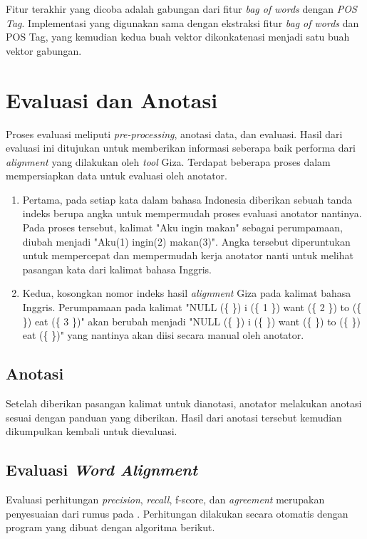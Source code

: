 Fitur terakhir yang dicoba adalah gabungan dari fitur \textit{bag of words} dengan \textit{POS Tag}. Implementasi yang digunakan sama dengan ekstraksi fitur \textit{bag of words} dan POS Tag, yang kemudian kedua buah vektor dikonkatenasi menjadi satu buah vektor gabungan.

\section{Evaluasi dan Anotasi}

Proses evaluasi meliputi \textit{pre-processing}, anotasi data, dan evaluasi. Hasil dari evaluasi ini ditujukan untuk memberikan informasi seberapa baik performa dari \textit{alignment} yang dilakukan oleh \textit{tool} Giza. Terdapat beberapa proses dalam mempersiapkan data untuk evaluasi oleh anotator.
\begin{enumerate}
	\item Pertama, pada setiap kata dalam bahasa Indonesia diberikan sebuah tanda indeks berupa angka untuk mempermudah proses evaluasi anotator nantinya. Pada proses tersebut, kalimat "Aku ingin makan" sebagai perumpamaan, diubah menjadi "Aku(1) ingin(2) makan(3)". Angka tersebut diperuntukan untuk mempercepat dan mempermudah kerja anotator nanti untuk melihat pasangan kata dari kalimat bahasa Inggris.
	\item Kedua, kosongkan nomor indeks hasil \textit{alignment} Giza pada kalimat bahasa Inggris. Perumpamaan pada kalimat "NULL (\{  \}) i (\{ 1 \}) want (\{ 2 \}) to (\{  \}) eat (\{ 3 \})" akan berubah menjadi  "NULL (\{  \}) i (\{  \}) want (\{   \}) to (\{  \}) eat (\{  \})" yang nantinya akan diisi secara manual oleh anotator.
\end{enumerate}

\subsection{Anotasi}
Setelah diberikan pasangan kalimat untuk dianotasi, anotator melakukan anotasi sesuai dengan panduan yang diberikan. Hasil dari anotasi tersebut kemudian dikumpulkan kembali untuk dievaluasi.

\subsection{Evaluasi \textit{Word Alignment}}
Evaluasi perhitungan \textit{precision}, \textit{recall}, f-score, dan \textit{agreement} merupakan penyesuaian dari rumus pada \citep{mihalcea2003evaluation}. Perhitungan dilakukan secara otomatis dengan program yang dibuat dengan algoritma berikut.

